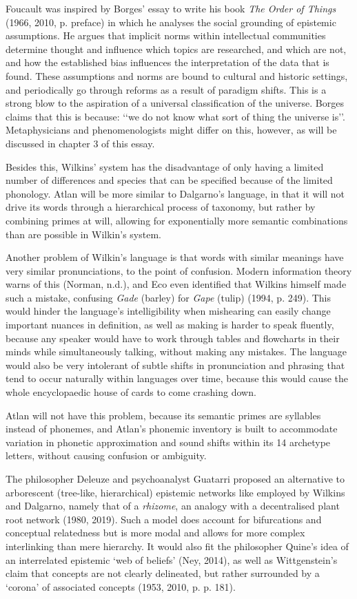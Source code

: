 Foucault was inspired by Borges’ essay to write his book \textit{The Order of Things} (1966, 2010, p. preface) in which he analyses the social grounding of epistemic assumptions. He argues that implicit norms within intellectual communities determine thought and influence which topics are researched, and which are not, and how the established bias influences the interpretation of the data that is found. These assumptions and norms are bound to cultural and historic settings, and periodically go through reforms as a result of paradigm shifts. This is a strong blow to the aspiration of a universal classification of the universe. Borges claims that this is because: ‘‘we do not know what sort of thing the universe is’’. Metaphysicians and phenomenologists might differ on this, however, as will be discussed in chapter 3 of this essay.  

Besides this, Wilkins’ system has the disadvantage of only having a limited number of differences and species that can be specified because of the limited phonology. Atlan will be more similar to Dalgarno’s language, in that it will not drive its words through a hierarchical process of taxonomy, but rather by combining primes at will, allowing for exponentially more semantic combinations than are possible in Wilkin’s system. 

Another problem of Wilkin’s language is that words with similar meanings have very similar pronunciations, to the point of confusion. Modern information theory warns of this (Norman, n.d.), and Eco even identified that Wilkins himself made such a mistake, confusing {\it Gade} (barley) for {\it Gape} (tulip) (1994, p. 249). This would hinder the language’s intelligibility when mishearing can easily change important nuances in definition, as well as making is harder to speak fluently, because any speaker would have to work through tables and flowcharts in their minds while simultaneously talking, without making any mistakes. The language would also be very intolerant of subtle shifts in pronunciation and phrasing that tend to occur naturally within languages over time, because this would cause the whole encyclopaedic house of cards to come crashing down. 

Atlan will not have this problem, because its semantic primes are syllables instead of phonemes, and Atlan’s phonemic inventory is built to accommodate variation in phonetic approximation and sound shifts within its 14 archetype letters, without causing confusion or ambiguity. 

The philosopher Deleuze and psychoanalyst Guatarri proposed an alternative to arborescent (tree-like, hierarchical) epistemic networks like employed by Wilkins and Dalgarno, namely that of a {\it rhizome}, an analogy with a decentralised plant root network (1980, 2019). Such a model does account for bifurcations and conceptual relatedness but is more modal and allows for more complex interlinking than mere hierarchy. It would also fit the philosopher Quine’s idea of an interrelated epistemic ‘web of beliefs’ (Ney, 2014), as well as Wittgenstein’s claim that concepts are not clearly delineated, but rather surrounded by a ‘corona’ of associated concepts (1953, 2010, p. p. 181). 

